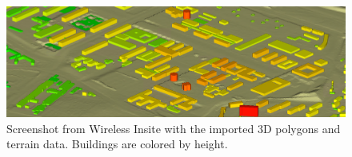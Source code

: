 \begin{figure}
    \centering
    \includegraphics{appendix/figures/raytracing_3d_model_example.png}
    \caption{Screenshot from Wireless Insite with the imported 3D polygons and terrain data. Buildings are colored by height.}
    \label{fig:raytracing_model_example}
\end{figure}




